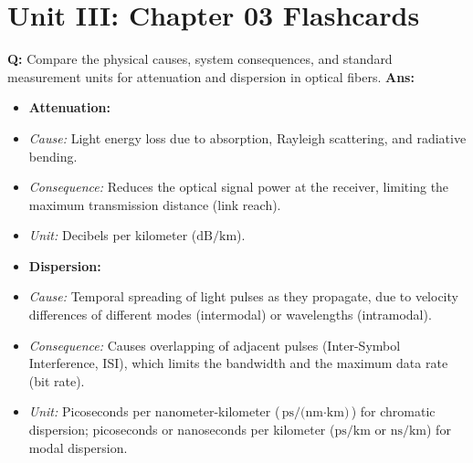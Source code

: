 \documentclass[10pt,a4paper,twocolumn]{article}
\begin{document}
\section*{Unit III: Chapter 03 Flashcards}

\begin{tcolorbox}[
  colback=white,
  colframe=UnitColorThree,
  colbacktitle=gray!10!white,
  coltitle=black,
  fonttitle=\bfseries\sffamily\small,
  title={Unit III $\bullet$ Card 1: Attenuation vs. Dispersion},
  boxrule=1.2pt,
  arc=2mm,
  outer arc=2mm,
  boxsep=1.5mm,
  top=1mm,
  bottom=1mm,
  left=1.5mm,
  right=1.5mm,
  before skip=2.5mm,
  after skip=2.5mm
]
\textbf{Q:} Compare the physical causes, system consequences, and standard measurement units for attenuation and dispersion in optical fibers.
\tcbline
\textbf{Ans:} \begin{itemize}
  \item   \textbf{Attenuation:}
  \item   \textit{Cause:} Light energy loss due to absorption, Rayleigh scattering, and radiative bending.
  \item   \textit{Consequence:} Reduces the optical signal power at the receiver, limiting the maximum transmission distance (link reach).
  \item   \textit{Unit:} Decibels per kilometer ($\text{dB/km}$).
  \item   \textbf{Dispersion:}
  \item   \textit{Cause:} Temporal spreading of light pulses as they propagate, due to velocity differences of different modes (intermodal) or wavelengths (intramodal).
  \item   \textit{Consequence:} Causes overlapping of adjacent pulses (Inter-Symbol Interference, ISI), which limits the bandwidth and the maximum data rate (bit rate).
  \item   \textit{Unit:} Picoseconds per nanometer-kilometer ($\text{ps/(nm}\cdot\text{km)}$) for chromatic dispersion; picoseconds or nanoseconds per kilometer ($\text{ps/km}$ or $\text{ns/km}$) for modal dispersion.
\end{itemize}
\end{tcolorbox}
\end{document}
